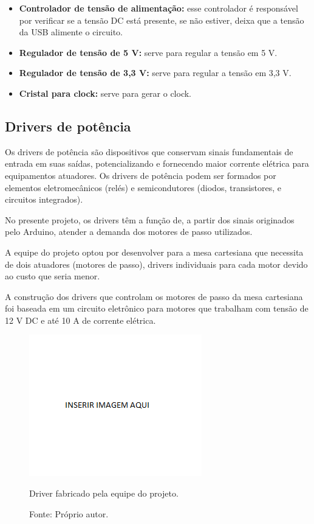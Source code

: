 \begin{itemize}
\item \textbf{Controlador de tensão de alimentação:} esse controlador é responsável por verificar se a tensão DC está presente, se não estiver, deixa que a tensão da USB alimente o circuito. 
\item \textbf{Regulador de tensão de 5 V:} serve para regular a tensão em 5 V.
\item \textbf{Regulador de tensão de 3,3 V:} serve para regular a tensão em 3,3 V.
\item \textbf{Cristal para clock:} serve para gerar o clock.
\end{itemize}

\subsection{Drivers de potência}

Os drivers de potência são dispositivos que conservam sinais fundamentais de entrada em suas saídas, 
potencializando e fornecendo maior corrente elétrica para equipamentos atuadores. Os drivers de potência 
podem ser formados por elementos eletromecânicos (relés) e semicondutores (diodos, transistores, e 
circuitos integrados). 

No presente projeto, os drivers têm a função de, a partir dos sinais originados pelo Arduino, atender 
a demanda dos motores de passo utilizados.

A equipe do projeto optou por desenvolver para a mesa cartesiana que necessita de dois atuadores 
(motores de passo), drivers individuais para cada motor devido ao custo que seria menor.

A construção dos drivers que controlam os motores de passo da mesa cartesiana foi baseada em um 
circuito eletrônico para motores que trabalham com tensão de 12 V DC e até 10 A de corrente elétrica. 

\begin{figure}[!htb]
\centering
\includegraphics[scale = 0.2]{figuras/3-13}
\caption{Driver fabricado pela equipe do projeto.}
\caption*{Fonte: Próprio autor.}
\label{figdriver}
\end{figure}
    
